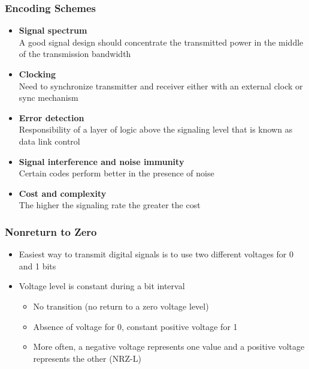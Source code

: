 \documentclass[pdflatex,compress]{beamer}
\begin{document}
\begin{frame}
	\frametitle{Encoding Schemes}
	\begin{itemize}
		\item \textbf{Signal spectrum}\\
		A good signal design should concentrate the transmitted power in the middle of the transmission bandwidth
		\item \textbf{Clocking}\\
		Need to synchronize transmitter and receiver either with an external clock or sync mechanism
		\item \textbf{Error detection}\\
		Responsibility of a layer of logic above the signaling level that is known as data link control
		\item \textbf{Signal interference and noise immunity}\\
		Certain codes perform better in the presence of noise
		\item \textbf{Cost and complexity}\\
		The higher the signaling rate the greater the cost
	\end{itemize}
\end{frame}

\begin{frame}
	\frametitle{Nonreturn to Zero}
	\begin{itemize}
		\item Easiest way to transmit digital signals is to use two different voltages for 0 and 1 bits
		\item Voltage level is constant during a bit interval
		\begin{itemize}
			\item No transition (no return to a zero voltage level)
			\item Absence of voltage for 0, constant positive voltage for 1
			\item More often, a negative voltage represents one value and a positive voltage represents the other (NRZ-L)
		\end{itemize}
	\end{itemize}
\end{frame}
\end{document}
